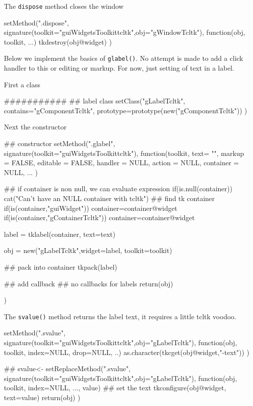 \documentclass[12pt]{article}
\newcommand{\RCode}[1]{\texttt{#1}}
\newcommand{\RFunc}[1]{\texttt{#1()}}
\begin{document}
The \RCode{dispose} method closes the window
\begin{Scode}
setMethod(".dispose",
          signature(toolkit="guiWidgetsToolkittcltk",obj="gWindowTcltk"),
          function(obj, toolkit, ...) {
            tkdestroy(obj@widget)
          })
\end{Scode}

Below we implement the basics of \RFunc{glabel}. No attempt is made to
add a click handler to this or editing or markup. For now, just
setting of text in a label.

First a class
\begin{Scode}
###########
## label class
setClass("gLabelTcltk",
contains="gComponentTcltk",
prototype=prototype(new("gComponentTcltk"))
)
\end{Scode}


Next the constructor
\begin{Scode}
  ## constructor
  setMethod(".glabel",
  signature(toolkit="guiWidgetsToolkittcltk"),
  function(toolkit,
  text= "", markup = FALSE, editable = FALSE, handler = NULL, 
  action = NULL, container = NULL, 
  ...
  ) {
    
    ## if container is non null, we can evaluate expression
    if(is.null(container)) {
      cat("Can't have an NULL container with tcltk")
    }
    ## find tk container
    if(is(container,"guiWidget")) container=container@widget
    if(is(container,"gContainerTcltk")) container=container@widget
    
    label = tklabel(container, text=text)
    
    obj = new("gLabelTcltk",widget=label, toolkit=toolkit)
    
    ## pack into container
    tkpack(label)
    
    ## add callback
    ## no callbacks for labels
    return(obj)
  })
\end{Scode}

The \RFunc{svalue} method returns the label text, it requires a little
tcltk voodoo.

\begin{Scode}
  setMethod(".svalue",
  signature(toolkit="guiWidgetsToolkittcltk",obj="gLabelTcltk"),
  function(obj, toolkit, index=NULL, drop=NULL, ..) {
    as.character(tkcget(obj@widget,"-text"))
  })
  
  ## svalue<-
  setReplaceMethod(".svalue",
  signature(toolkit="guiWidgetsToolkittcltk",obj="gLabelTcltk"),
  function(obj, toolkit, index=NULL, ..., value) {
    ## set the text
    tkconfigure(obj@widget, text=value)
    return(obj)
  })
\end{Scode}
\end{document}
